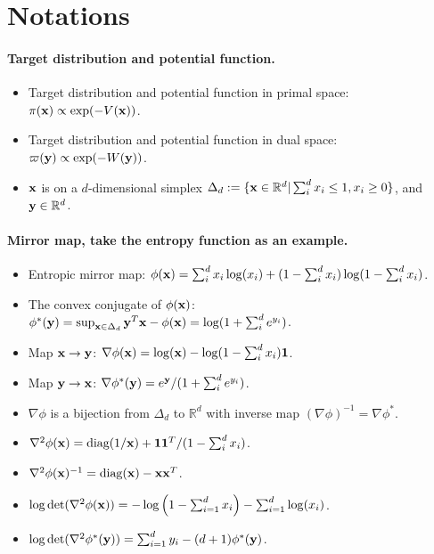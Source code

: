 \section{Notations}
\paragraph{Target distribution and potential function.}
\begin{itemize}
	\item Target distribution and potential function in primal space: $\pi(\mathbf{x}) \propto\exp(-V(\mathbf{x}))$.
	\item Target distribution and potential function in dual space: $\varpi(\mathbf{y}) \propto \exp(-W(\mathbf{y}))$.
	\item $\mathbf{x}$ is on a $d$-dimensional simplex $\Delta_d := \{\mathbf{x}\in\mathbb{R}^d|\sum_i^d x_i\leq 1, x_i\geq 0\}$, and $\mathbf{y} \in \mathbb{R}^d$.
\end{itemize}

\paragraph{Mirror map, take the entropy function as an example.}
\begin{itemize}
	\item Entropic mirror map: $\phi(\mathbf{x}) = \sum_i^d x_i\log(x_i) + (1 - \sum_i^d x_i)\log(1 - \sum_i^d x_i)$.
	\item The convex conjugate of $\phi(\mathbf{x})$: $\phi^*(\mathbf{y}) = \sup_{\mathbf{x} \in \Delta_d} \mathbf{y}^T\mathbf{x} - \phi(\mathbf{x}) = \log(1+\sum_i^d e^{y_i})$.
	\item Map $\mathbf{x}\to\mathbf{y}$: $\nabla \phi(\mathbf{x}) = \log(\mathbf{x}) - \log(1 - \sum_i^d x_i)\mathbf{1}$.
	\item Map $\mathbf{y}\to\mathbf{x}$: $\nabla \phi^*(\mathbf{y}) = e^{\mathbf{y}} / (1 + \sum_i^d e^{y_i})$.
	\item $\nabla \phi$ is a bijection from $\Delta_d$ to $\mathbb{R}^d$ with inverse map $(\nabla\phi)^{-1}=\nabla\phi^*$.
	\item $\nabla^2\phi(\mathbf{x}) = \text{diag}(1/\mathbf{x}) + \mathbf{1}\mathbf{1}^T / (1 - \sum_i^d x_i)$.
	\item $\nabla^2\phi(\mathbf{x})^{-1} = \text{diag}(\mathbf{x}) - \mathbf{x}\mathbf{x}^T$.
	\item $\log\det(\nabla^2\phi(\mathbf{x})) = -\log\left(1 - \sum_{i=1}^d x_i\right) - \sum_{i=1}^d\log(x_i)$.
	\item $\log\det(\nabla^2\phi^*(\mathbf{y})) = \sum_{i=1}^d y_i - (d + 1)\phi^*(\mathbf{y})$.
\end{itemize}

